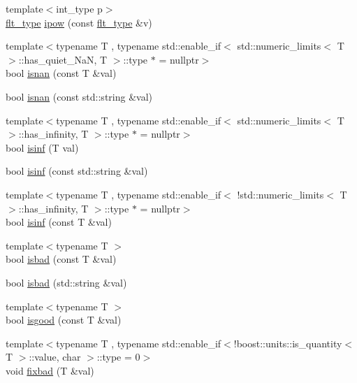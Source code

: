 \begin{DoxyCompactItemize}
\item 
{\footnotesize template$<$int\-\_\-type p$>$ }\\\hyperlink{lib_2IceBRG__main_2common_8h_ad0f130a56eeb944d9ef2692ee881ecc4}{flt\-\_\-type} \hyperlink{namespaceIceBRG_aecfcbd2c8977334d94e794f80ce161c5}{ipow} (const \hyperlink{lib_2IceBRG__main_2common_8h_ad0f130a56eeb944d9ef2692ee881ecc4}{flt\-\_\-type} \&v)
\item 
{\footnotesize template$<$typename T , typename std\-::enable\-\_\-if$<$ std\-::numeric\-\_\-limits$<$ T $>$\-::has\-\_\-quiet\-\_\-\-Na\-N, T $>$\-::type $\ast$  = nullptr$>$ }\\bool \hyperlink{namespaceIceBRG_adbe9ce0cffebbd69fcb608e82c981c88}{isnan} (const T \&val)
\item 
bool \hyperlink{namespaceIceBRG_a027dae62449c386354edc015ff2ad4c3}{isnan} (const std\-::string \&val)
\item 
{\footnotesize template$<$typename T , typename std\-::enable\-\_\-if$<$ std\-::numeric\-\_\-limits$<$ T $>$\-::has\-\_\-infinity, T $>$\-::type $\ast$  = nullptr$>$ }\\bool \hyperlink{namespaceIceBRG_a4cb3be60db622e1725dd98f1d2a9426e}{isinf} (T val)
\item 
bool \hyperlink{namespaceIceBRG_aaa4ce17f7d4a69e37d9938a884e59e0b}{isinf} (const std\-::string \&val)
\item 
{\footnotesize template$<$typename T , typename std\-::enable\-\_\-if$<$ !std\-::numeric\-\_\-limits$<$ T $>$\-::has\-\_\-infinity, T $>$\-::type $\ast$  = nullptr$>$ }\\bool \hyperlink{namespaceIceBRG_a1de0e89c2b5cbac3986540f5de1aba7b}{isinf} (const T \&val)
\item 
{\footnotesize template$<$typename T $>$ }\\bool \hyperlink{namespaceIceBRG_a9f5f5e14a09c77d24762abb9a9113c44}{isbad} (const T \&val)
\item 
bool \hyperlink{namespaceIceBRG_ae949c431603e4a17fca77492139a5588}{isbad} (std\-::string \&val)
\item 
{\footnotesize template$<$typename T $>$ }\\bool \hyperlink{namespaceIceBRG_a7753729aa16c554765dc86e409d093b0}{isgood} (const T \&val)
\item 
{\footnotesize template$<$typename T , typename std\-::enable\-\_\-if$<$!boost\-::units\-::is\-\_\-quantity$<$ T $>$\-::value, char $>$\-::type  = 0$>$ }\\void \hyperlink{namespaceIceBRG_a8a20b03a1a9e2b214eb673dd7b999f6c}{fixbad} (T \&val)

\end{DoxyCompactItemize}
